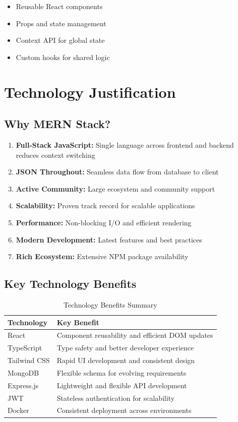 \documentclass[12pt,a4paper]{report}
\begin{document}
\begin{itemize}[leftmargin=*]
    \item Reusable React components
    \item Props and state management
    \item Context API for global state
    \item Custom hooks for shared logic
\end{itemize}

\section{Technology Justification}

\subsection{Why MERN Stack?}

\begin{enumerate}[leftmargin=*]
    \item \textbf{Full-Stack JavaScript:} Single language across frontend and backend reduces context switching
    \item \textbf{JSON Throughout:} Seamless data flow from database to client
    \item \textbf{Active Community:} Large ecosystem and community support
    \item \textbf{Scalability:} Proven track record for scalable applications
    \item \textbf{Performance:} Non-blocking I/O and efficient rendering
    \item \textbf{Modern Development:} Latest features and best practices
    \item \textbf{Rich Ecosystem:} Extensive NPM package availability
\end{enumerate}

\subsection{Key Technology Benefits}

\begin{table}[h]
\centering
\begin{tabular}{|p{4cm}|p{9cm}|}
\hline
\textbf{Technology} & \textbf{Key Benefit} \\
\hline
React & Component reusability and efficient DOM updates \\
\hline
TypeScript & Type safety and better developer experience \\
\hline
Tailwind CSS & Rapid UI development and consistent design \\
\hline
MongoDB & Flexible schema for evolving requirements \\
\hline
Express.js & Lightweight and flexible API development \\
\hline
JWT & Stateless authentication for scalability \\
\hline
Docker & Consistent deployment across environments \\
\hline
\end{tabular}
\caption{Technology Benefits Summary}
\end{table}
\end{document}
